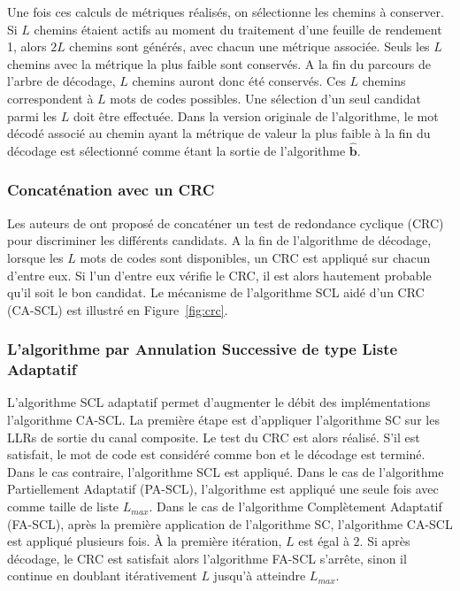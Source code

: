 Une fois ces calculs de métriques réalisés, on sélectionne les chemins à conserver. Si $L$ chemins étaient actifs au moment du traitement d'une feuille de rendement 1, alors $2L$ chemins sont générés, avec chacun une métrique associée. Seuls les $L$ chemins avec la métrique la plus faible sont conservés. A la fin du parcours de l'arbre de décodage, $L$ chemins auront donc été conservés. Ces $L$ chemins correspondent à $L$ mots de codes possibles. Une sélection d'un seul candidat parmi les $L$ doit être effectuée. Dans la version originale de l'algorithme, le mot décodé associé au chemin ayant la métrique de valeur la plus faible à la fin du décodage est sélectionné comme étant la sortie de l'algorithme $\mathbold{\hat{b}}$.



\subsubsection{Concaténation avec un CRC}
Les auteurs de \cite{tal_how_2013} ont proposé de concaténer un test de redondance cyclique (CRC) pour discriminer les différents candidats. A la fin de l'algorithme de décodage, lorsque les $L$ mots de codes sont disponibles, un CRC est appliqué sur chacun d'entre eux. Si l'un d'entre eux vérifie le CRC, il est alors hautement probable qu'il soit le bon candidat. Le mécanisme de l'algorithme SCL aidé d'un CRC (CA-SCL) est illustré en Figure~\ref{fig:crc}.

\subsubsection{L'algorithme par Annulation Successive de type Liste Adaptatif}

L'algorithme SCL adaptatif permet d'augmenter le débit des implémentations l'algorithme CA-SCL. La première étape est d'appliquer l'algorithme SC sur les LLRs de sortie du canal composite. Le test du CRC est alors réalisé. S'il est satisfait, le mot de code est considéré comme bon et le décodage est terminé. Dans le cas contraire, l'algorithme SCL est appliqué. Dans le cas de l'algorithme Partiellement Adaptatif (PA-SCL), l'algorithme est appliqué une seule fois avec comme taille de liste $L_{max}$. Dans le cas de l'algorithme Complètement Adaptatif (FA-SCL), après la première application de l'algorithme SC, l'algorithme CA-SCL est appliqué plusieurs fois. \`A la première itération, $L$ est égal à $2$. Si après décodage, le CRC est satisfait alors l'algorithme FA-SCL s'arrête, sinon il continue en doublant itérativement $L$ jusqu'à atteindre $L_{max}$.


